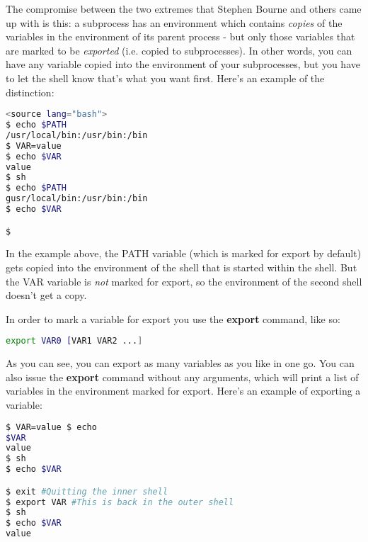 The compromise between the two extremes that Stephen Bourne and others came up
with is this: a subprocess has an environment which contains \textit{copies} of
the variables in the environment of its parent process - but only those
variables that are marked to be \textit{exported} (i.e. copied to
subprocesses). In other words, you can have any variable copied into the
environment of your subprocesses, but you have to let the shell know that's
what you want first. Here's an example of the distinction:


\lstset{basicstyle=\scriptsize, numbers=left, captionpos=b, tabsize=4}
\begin{lstlisting}[caption=Exported and non-exported variables,language={bash},
xleftmargin=15pt,label=lst:Exported and non-exported variables]
<source lang="bash">
$ echo $PATH
/usr/local/bin:/usr/bin:/bin
$ VAR=value
$ echo $VAR
value
$ sh
$ echo $PATH
gusr/local/bin:/usr/bin:/bin
$ echo $VAR

$
\end{lstlisting}

In the example above, the PATH variable (which is marked for export by default)
gets copied into the environment of the shell that is started within the shell.
But the VAR variable is \textit{not} marked for export, so the environment of
the second shell doesn't get a copy.

In order to mark a variable for export you use the \textbf{export} command,
like so:

\lstset{basicstyle=\scriptsize, numbers=left, captionpos=b, tabsize=4}
\begin{lstlisting}[language={bash},
xleftmargin=15pt]
export VAR0 [VAR1 VAR2 ...]
\end{lstlisting}

As you can see, you can export as many variables as you like in one go. You can
also issue the \textbf{export} command without any arguments, which will print
a list of variables in the environment marked for export. Here's an example of
exporting a variable:
\lstset{basicstyle=\scriptsize, numbers=left, captionpos=b, tabsize=4}
\begin{lstlisting}[caption=Exporting a variable,language={bash},
xleftmargin=15pt,label=lst:Exporting a variable]
$ VAR=value $ echo
$VAR
value
$ sh
$ echo $VAR

$ exit #Quitting the inner shell
$ export VAR #This is back in the outer shell
$ sh
$ echo $VAR
value
\end{lstlisting}

